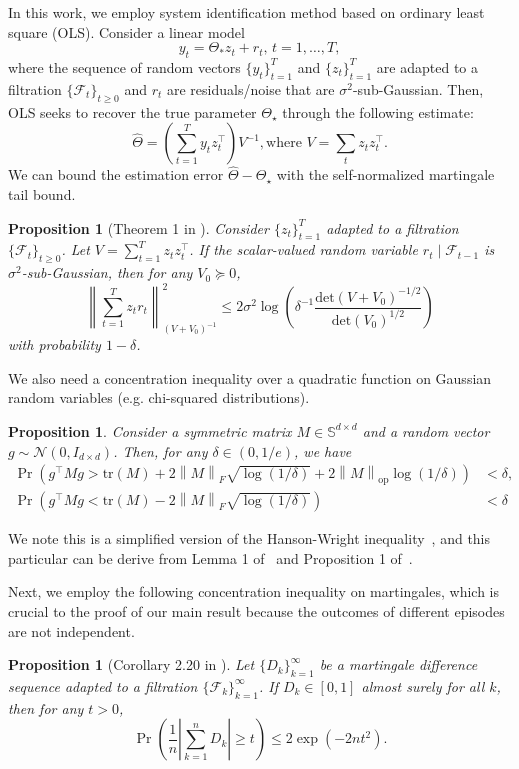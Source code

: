 \documentclass[11pt, twoside]{article}
\newtheorem{proposition}[theorem]{Proposition}
\theoremstyle{definition}
\newcommand{\norm}[1]{\left\lVert #1 \right\rVert}
\newcommand{\tr}{\mathrm{tr}}
\newcommand{\opnorm}[1]{\norm{#1}_{\mathrm{op}}}
\begin{document}
In this work, we employ system identification method based on ordinary least square (OLS).
Consider a linear model
\[ y_t = \Theta_* z_t + r_t, \, t = 1, \dots, T, \]
where the sequence of random vectors $\{y_t\}_{t=1}^T$ and $\{z_t\}_{t=1}^T$ are adapted to a filtration $\{\mathcal{F}_t\}_{t \ge 0}$ and $r_t$ are residuals/noise that are $\sigma^2$-sub-Gaussian.
Then, OLS seeks to recover the true parameter $\Theta_\star$ through the following estimate:
\[\hat\Theta = \left(\sum_{t=1}^{T} y_t z_t^\top\right) V^{-1}, \text{where } V= \sum_t z_t z_t^\top.\]
We can bound the estimation error $\hat\Theta - \Theta_\star$ with the self-normalized martingale tail bound.

\begin{proposition}[Theorem 1 in \cite{abbasi2011improved}]
\label{thm:self-normalized}
    Consider $\{z_t\}_{t=1}^T$ adapted to a filtration $\{\mathcal{F}_t\}_{t \ge 0}$.
    Let $V = \sum_{t=1}^T z_t z_t^\top$.
    If the scalar-valued random variable $r_t \mid \mathcal{F}_{t-1}$ is $\sigma^2$-sub-Gaussian, then for any $V_0 \succeq 0$,
    \[ \norm{\sum_{t=1}^T z_t r_t}_{(V + V_0)^{-1}}^2 \le 2 \sigma^2 \log\left(\delta^{-1} \frac{\mathrm{det}(V + V_0)^{-1/2}}{\mathrm{det}( V_0)^{1/2}}\right)\]
    with probability $1-\delta$.
\end{proposition}


We also need a concentration inequality over a quadratic function on Gaussian random variables (e.g. chi-squared distributions).
\begin{proposition}
\label{thm:hanson-wright}
    Consider a symmetric matrix $M \in \mathbb{S}^{d \times d}$ and a random vector $g \sim \mathcal{N}(0, I_{d \times d})$.
    Then, for any $\delta \in (0, 1/e)$, we have
    \begin{align*}
    \Pr\left(g^\top M g > \tr(M) + 2 \norm{M}_F \sqrt{\log(1/\delta)} + 2\opnorm{M} \log(1/\delta) \right) &< \delta, \\
    \Pr\left(g^\top M g< \tr(M) - 2\norm{M}_F \sqrt{\log(1/\delta)}\right) &< \delta
\end{align*}
\end{proposition}
We note this is a simplified version of the Hanson-Wright inequality~\cite{rudelson2013hanson}, and this particular can be derive from Lemma 1 of~\cite{laurent2000adaptive} and Proposition 1 of~\cite{hsu2012tail}.

Next, we employ the following concentration inequality on martingales, which is crucial to the proof of our main result because the outcomes of different episodes are not independent.
\begin{proposition}[Corollary 2.20 in \cite{wainwright2019high}]
\label{thm:azuma-hoeffding}
Let $\{D_k\}_{k=1}^\infty$ be a martingale difference sequence adapted to a filtration $\{\mathcal{F}_k\}_{k=1}^\infty$.
If $D_k \in [0, 1]$ almost surely for all $k$, then for any $t > 0$,
\[\Pr\left(\frac{1}{n}\left|\sum_{k=1}^n D_k\right| \ge t\right) \le 2 \exp(-2nt^2).\]
\end{proposition}
\end{document}
